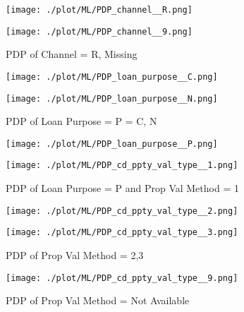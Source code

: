\begin{figure}[H]
\begin{minipage}{.5\textwidth}
	\centering
	\texttt{[image: ./plot/ML/PDP\_channel\_\_R.png]}
\end{minipage}%
\begin{minipage}{.5\textwidth}
	\centering
	\texttt{[image: ./plot/ML/PDP\_channel\_\_9.png]}
\end{minipage}
    \caption{PDP of Channel = R, Missing}
\end{figure}

\begin{figure}[H]
\begin{minipage}{.5\textwidth}
	\centering
	\texttt{[image: ./plot/ML/PDP\_loan\_purpose\_\_C.png]}
\end{minipage}%
\begin{minipage}{.5\textwidth}
	\centering
	\texttt{[image: ./plot/ML/PDP\_loan\_purpose\_\_N.png]}
\end{minipage}
    \caption{PDP of Loan Purpose = P = C, N}
\end{figure}

\begin{figure}[H]
\begin{minipage}{.5\textwidth}
	\centering
	\texttt{[image: ./plot/ML/PDP\_loan\_purpose\_\_P.png]}
\end{minipage}%
\begin{minipage}{.5\textwidth}
	\centering
	\texttt{[image: ./plot/ML/PDP\_cd\_ppty\_val\_type\_\_1.png]}
\end{minipage}
    \caption{PDP of Loan Purpose = P and Prop Val Method = 1}
\end{figure}

\begin{figure}[H]
\begin{minipage}{.5\textwidth}
	\centering
	\texttt{[image: ./plot/ML/PDP\_cd\_ppty\_val\_type\_\_2.png]}
\end{minipage}%
\begin{minipage}{.5\textwidth}
	\centering
	\texttt{[image: ./plot/ML/PDP\_cd\_ppty\_val\_type\_\_3.png]}
\end{minipage}
    \caption{PDP of Prop Val Method = 2,3}
\end{figure}

\begin{figure}[H]
	\centering
	\texttt{[image: ./plot/ML/PDP\_cd\_ppty\_val\_type\_\_9.png]}
    \caption{PDP of Prop Val Method = Not Available}
\end{figure}

